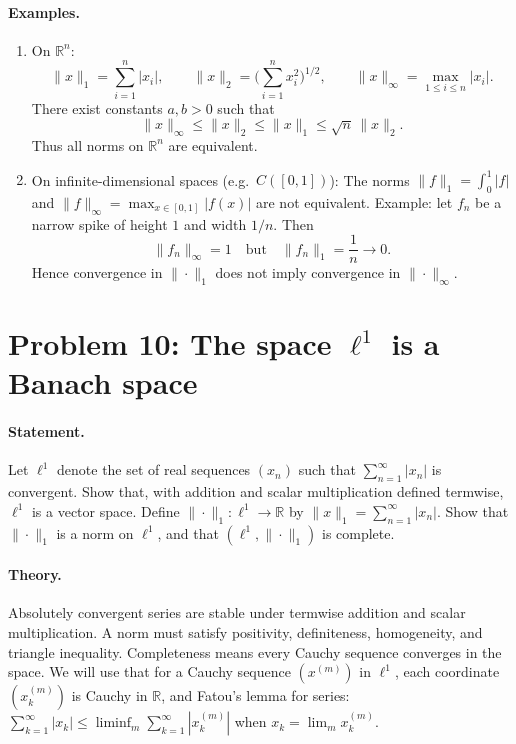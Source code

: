 \documentclass[12pt,a4paper]{article}
\theoremstyle{plain}
\theoremstyle{definition}
\theoremstyle{remark}
\theoremstyle{remark}
\begin{document}
\paragraph{Examples.}
\begin{enumerate}
	\item On $\mathbb{R}^n$:
	\[
	\|x\|_1=\sum_{i=1}^n |x_i|,\qquad
	\|x\|_2=\Big(\sum_{i=1}^n x_i^2\Big)^{1/2},\qquad
	\|x\|_\infty=\max_{1\le i\le n}|x_i|.
	\]
	There exist constants $a,b>0$ such that
	\[
	\|x\|_\infty \le \|x\|_2 \le \|x\|_1 \le \sqrt{n}\,\|x\|_2.
	\]
	Thus all norms on $\mathbb{R}^n$ are equivalent.
	
	\item On infinite-dimensional spaces (e.g.\ $C([0,1])$):
	The norms $\|f\|_1=\int_0^1 |f|$ and $\|f\|_\infty=\max_{x\in[0,1]}|f(x)|$ are not equivalent.
	Example: let $f_n$ be a narrow spike of height $1$ and width $1/n$. Then
	\[
	\|f_n\|_\infty=1 \quad \text{but} \quad \|f_n\|_1=\frac{1}{n}\to 0.
	\]
	Hence convergence in $\|\cdot\|_1$ does not imply convergence in $\|\cdot\|_\infty$.
\end{enumerate}

\section*{Problem 10: The space $\ell^1$ is a Banach space}

\paragraph{Statement.}
Let $\ell^1$ denote the set of real sequences $(x_n)$ such that $\sum_{n=1}^{\infty}|x_n|$ is convergent.
Show that, with addition and scalar multiplication defined termwise, $\ell^1$ is a vector space.
Define $\|\cdot\|_1:\ell^1\to\mathbb{R}$ by $\|x\|_1=\sum_{n=1}^{\infty}|x_n|$.
Show that $\|\cdot\|_1$ is a norm on $\ell^1$, and that $(\ell^1,\|\cdot\|_1)$ is complete.

\paragraph{Theory.}
Absolutely convergent series are stable under termwise addition and scalar multiplication.
A norm must satisfy positivity, definiteness, homogeneity, and triangle inequality.
Completeness means every Cauchy sequence converges in the space.
We will use that for a Cauchy sequence $(x^{(m)})$ in $\ell^1$,
each coordinate $(x^{(m)}_k)$ is Cauchy in $\mathbb{R}$, and Fatou's lemma for series:
$\sum_{k=1}^\infty |x_k| \le \liminf_{m}\sum_{k=1}^\infty |x^{(m)}_k|$ when $x_k=\lim_m x^{(m)}_k$.
\end{document}
